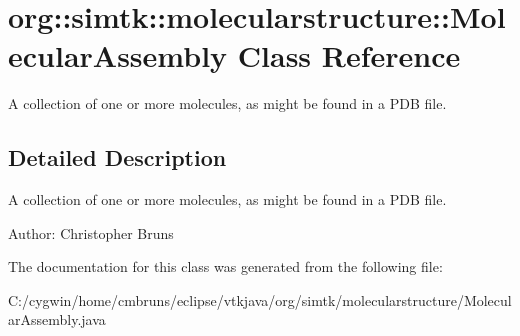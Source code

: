 \section{org::simtk::molecularstructure::Molecular\-Assembly Class Reference}
\label{classorg_1_1simtk_1_1molecularstructure_1_1_molecular_assembly}
A collection of one or more molecules, as might be found in a PDB file.  




\subsection{Detailed Description}
A collection of one or more molecules, as might be found in a PDB file. 

\begin{Desc}
\item[Author:]Christopher Bruns \end{Desc}




The documentation for this class was generated from the following file:\begin{CompactItemize}
\item 
C:/cygwin/home/cmbruns/eclipse/vtkjava/org/simtk/molecularstructure/Molecular\-Assembly.java\end{CompactItemize}
